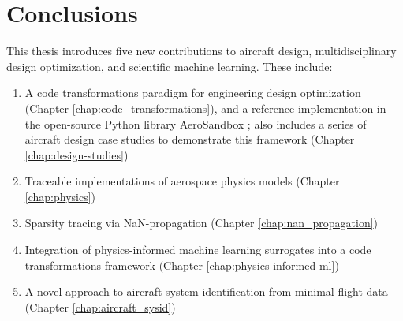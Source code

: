 \chapter{Conclusions}

This thesis introduces five new contributions to aircraft design, multidisciplinary design optimization, and scientific machine learning. These include:

\begin{enumerate}[noitemsep]
    \item A code transformations paradigm for engineering design optimization (Chapter \ref{chap:code_transformations}), and a reference implementation in the open-source Python library AeroSandbox \cite{asb_github}; also includes a series of aircraft design case studies to demonstrate this framework (Chapter \ref{chap:design-studies})
    \item Traceable implementations of aerospace physics models (Chapter \ref{chap:physics})
    \item Sparsity tracing via NaN-propagation (Chapter \ref{chap:nan_propagation})
    \item Integration of physics-informed machine learning surrogates into a code transformations framework (Chapter \ref{chap:physics-informed-ml})
    \item A novel approach to aircraft system identification from minimal flight data (Chapter \ref{chap:aircraft_sysid})
\end{enumerate}

